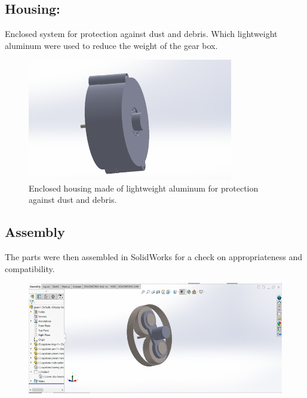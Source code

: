 \documentclass[../../main]{subfiles}
\begin{document}
\subsection{Housing:} 
Enclosed system for protection against dust and debris.
Which lightweight aluminum were used to reduce the weight of the gear
box.
\begin{figure}[h]
  \centering
  \includegraphics[width=0.8\textwidth]{sublatex/Opryrmi/media/image5.png} 
  \caption[Aluminum Housing for Dust Protection]{Enclosed housing made of lightweight aluminum for protection against dust and debris.}
\end{figure}

\newpage
\subsection{Assembly}

The parts were then assembled in SolidWorks for a check on
appropriateness and \\ compatibility.
\begin{figure}[h]
  \centering
\includegraphics[]{sublatex/Opryrmi/media/image6.png}
\caption{}
\end{figure}
\end{document}
